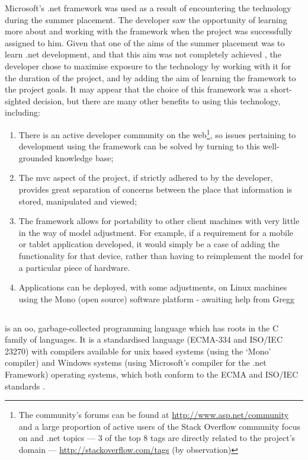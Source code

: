 Microsoft's .\gls{net} framework was used as a result of encountering the technology during the summer placement.  The developer saw the opportunity of learning more about and working with the framework when the project was successfully assigned to him.  Given that one of the aims of the summer placement was to learn .\gls{net} development, and that this aim was not completely achieved \cite{summerPlacementReport}, the developer chose to maximise exposure to the technology by working with it for the duration of the project, and by adding the aim of learning the framework to the project goals.  It may appear that the choice of this framework was a short-sighted decision, but there are many other benefits to using this technology, including:
\begin{enumerate}
	\item There is an active developer community on the web\footnote{The community's forums can be found at \url{http://www.asp.net/community} and a large proportion of active users of the Stack Overflow community focus on \cs{} and .\gls{net} topics --- 3 of the top 8 tags are directly related to the project's domain --- \url{http://stackoverflow.com/tags} (by observation)}, so issues pertaining to development using the framework can be solved by turning to this well-grounded knowledge base;
	\item The \gls{mvc} aspect of the project, if strictly adhered to by the developer, provides great separation of concerns between the place that information is stored, manipulated and viewed;
	\item The framework allows for portability to other client machines with very little in the way of model adjustment. For example, if a requirement for a mobile or tablet application developed, it would simply be a case of adding the functionality for that device, rather than having to reimplement the model for a particular piece of hardware.
	\item Applications can be deployed, with some adjustments, on Linux machines using the Mono (open source) software platform \revisit - awaiting help from Gregg
\end{enumerate}

\subsection{\cs}
\label{csharpDiscussion}
\cs{} is an \gls{oo}, garbage-collected programming language which has roots in the C family of languages.  It is a standardised language (ECMA-334 and ISO/IEC 23270) with compilers available for unix based systems (using the `Mono' compiler) and Windows systems (using Microsoft's \cs{} compiler for the .\gls{net} Framework) operating systems, which both conform to the ECMA and ISO/IEC standards \cite{monoStandardised} \cite{csPL}.

